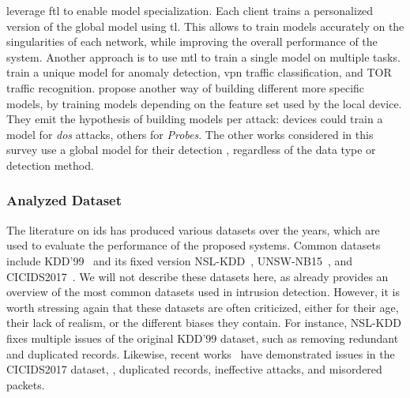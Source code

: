 \textcite{fan_IoTDefenderFederatedTransfer_2020} leverage \gls{ftl} to enable model specialization.
Each client trains a personalized version of the global model using \gls{tl}.
This allows to train models accurately on the singularities of each network, while improving the overall performance of the system.
Another approach is to use \gls{mtl} to train a single model on multiple tasks.
\textcite{zhao_MultiTaskNetworkAnomaly_2019} train a unique model for anomaly detection, \gls{vpn} traffic classification, and TOR traffic recognition.
\textcite{qin_FederatedLearningBasedNetwork_2021} propose another way of building different more specific models, by training models depending on the feature set used by the local device.
They emit the hypothesis of building models per attack: devices could train a model for \emph{\gls{dos}} attacks, others for \emph{Probes}.
The other works considered in this survey use a global model for their detection \cite{zhang_BlockchainbasedFederatedLearning_2020,schneble_Attackdetectionusing_2019,li_DeepFedFederatedDeep_2020,chen_Networkanomalydetection_2020,rahman_InternetThingsIntrusion_2020,al-athbaal-marri_FederatedMimicLearning_2020,kim_CollaborativeAnomalyDetection_2020,qin_LineSpeedScalableIntrusion_2020a,chen_IntrusionDetectionWireless_2020,hei_trustedfeatureaggregator_2020,li_DeepFedFederatedDeep_2020,popoola_FederatedDeepLearning_2021a}, regardless of the data type or detection method.


\subsubsection{Analyzed Dataset\label{sec:sota.quali.dataset}}

The literature on \gls{ids} has produced various datasets over the years, which are used to evaluate the performance of the proposed systems.
Common datasets include KDD'99~\cite{kddcup99} and its fixed version NSL-KDD~\cite{tavallaee_detailedanalysisKDD_2009}, UNSW-NB15~\cite{moustafa_UNSWNB15comprehensivedata_2015}, and CICIDS2017~\cite{sharafaldin_GeneratingNewIntrusion_2018}.
We will not describe these datasets here, as  already provides an overview of the most common datasets used in intrusion detection.
However, it is worth stressing again that these datasets are often criticized, either for their age, their lack of realism, or the different biases they contain.
For instance, NSL-KDD fixes multiple issues of the original KDD'99 dataset, such as removing redundant and duplicated records.
Likewise, recent works~\cite{lanvin_ErrorsCICIDS2017dataset_2022,engelen_TroubleshootingIntrusionDetection_2021} have demonstrated issues in the CICIDS2017 dataset, \eg, duplicated records, ineffective attacks, and misordered packets.

